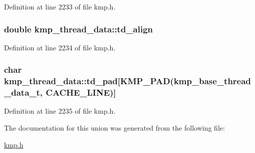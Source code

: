 Definition at line 2233 of file kmp.\-h.

\hypertarget{unionkmp__thread__data_a827df3ddfdd40df4ed9f3c5f01cd88c8}{
\subsubsection[{td\-\_\-align}]{\setlength{\rightskip}{0pt plus 5cm}double kmp\-\_\-thread\-\_\-data\-::td\-\_\-align}}\label{unionkmp__thread__data_a827df3ddfdd40df4ed9f3c5f01cd88c8}


Definition at line 2234 of file kmp.\-h.

\hypertarget{unionkmp__thread__data_a3a2d79e5de9017bc88ce99870eeaad55}{
\subsubsection[{td\-\_\-pad}]{\setlength{\rightskip}{0pt plus 5cm}char kmp\-\_\-thread\-\_\-data\-::td\-\_\-pad\mbox{[}{\bf K\-M\-P\-\_\-\-P\-A\-D}({\bf kmp\-\_\-base\-\_\-thread\-\_\-data\-\_\-t}, {\bf C\-A\-C\-H\-E\-\_\-\-L\-I\-N\-E})\mbox{]}}}\label{unionkmp__thread__data_a3a2d79e5de9017bc88ce99870eeaad55}


Definition at line 2235 of file kmp.\-h.



The documentation for this union was generated from the following file\-:\begin{DoxyCompactItemize}
\item 
\hyperlink{kmp_8h}{kmp.\-h}\end{DoxyCompactItemize}
